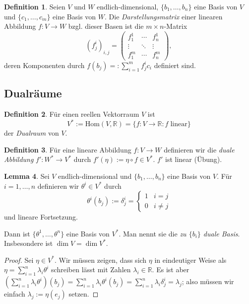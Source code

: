 \documentclass[a4paper]{scrreprt}
\numberwithin{equation}{chapter}
\newcommand{\R}{\mathbb{R}}
\theoremstyle{definition}
\newtheorem{defn}{Definition}[section]
\newtheorem{lemma}[defn]{Lemma}
\begin{document}
\begin{defn}
	Seien $V$ und $W$ endlich-dimensional, $\{b_1,\dots,b_n\}$ eine Basis von $V$ und $\{c_1,\dots,c_m\}$ eine Basis von $W$. Die \emph{Darstellungsmatrix} einer linearen Abbildung $f\colon V \to W$ bzgl. dieser Basen ist die $m\times n$-Matrix
	\[(f^i_j)_{i,j} = \begin{pmatrix}
		f^1_1 & \cdots & f^1_n\\
		\vdots & \ddots & \vdots\\
		f^m_1 & \cdots & f^m_n
	\end{pmatrix},\]
	deren Komponenten durch $f(b_j) =: \sum_{i=1}^m f^i_j c_i$ definiert sind.
\end{defn}

\subsection{Dualräume}

\begin{defn}
	Für einen reellen Vektorraum $V$ ist
	\[V^* := \mathrm{Hom}(V,\R) = \{f\colon V \to \R : f \; \text{linear}\}\]
	der \emph{Dualraum} von $V$.
\end{defn}

\begin{defn}
	Für eine lineare Abbildung $f\colon V \to W$ definieren wir die \emph{duale Abbildung} $f' \colon W^* \to V^*$ durch $f'(\eta) := \eta \circ f \in V^*$. $f'$ ist linear (Übung).
\end{defn}

\begin{lemma}
	Sei $V$ endlich-dimensional und $\{b_1,\dots,b_n\}$ eine Basis von $V$. Für $i = 1,\dots,n$ definieren wir $\theta^i \in V^*$ durch
	\[\theta^i(b_j) := \delta^i_j = \begin{cases} 1 & i = j \\ 0 & i \ne j\end{cases}\]
	und lineare Fortsetzung.

	Dann ist $\{\theta^1, \dots, \theta^n\}$ eine Basis von $V^*$. Man nennt sie die \emph{zu $\{b_i\}$ duale Basis}. Insbesondere ist $\dim V = \dim V^*$.

	\begin{proof}
		Sei $\eta \in V^*$. Wir müssen zeigen, dass sich $\eta$ in eindeutiger Weise als $\eta = \sum_{i=1}^n \lambda_i \theta^i$ schreiben lässt mit Zahlen $\lambda_i\in\R$. Es ist aber $\left(\sum_{i=1}^n \lambda_i \theta^i\right)(b_j) = \sum_{i=1}^n \lambda_i \theta^i(b_j) = \sum_{i=1}^n \lambda_i \delta^i_j = \lambda_j$; also müssen wir einfach $\lambda_j := \eta(e_j)$ setzen.
	\end{proof}
\end{lemma}
\end{document}
